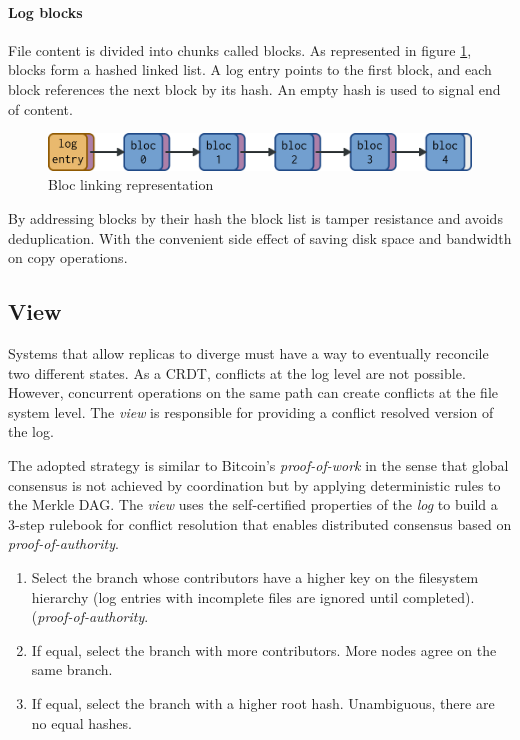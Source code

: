 \documentclass{sig-alternate}
\begin{document}
\paragraph{Log blocks}

File content is divided into chunks called blocks. As represented in figure \ref{fig:blocs}, blocks form a hashed linked list. A log entry points to the first block, and each block references the next block by its hash. An empty hash is used to signal end of content.

\begin{figure}
\centering
\includegraphics[width=\columnwidth]{imgs/blocs.png}
\caption{Bloc linking representation}
\label{fig:blocs}
\end{figure}

By addressing blocks by their hash the block list is tamper resistance and avoids deduplication. With the convenient side effect of saving disk space and bandwidth on copy operations.

\subsection{View} \label{view}

Systems that allow replicas to diverge must have a way to eventually reconcile two different states. As a CRDT, conflicts at the log level are not possible. However, concurrent operations on the same path can create conflicts at the file system level. The \textit{view} is responsible for providing a conflict resolved version of the log.

The adopted strategy is similar to Bitcoin's \textit{proof-of-work} in the sense that global consensus is not achieved by coordination but by applying deterministic rules to the Merkle DAG. The \textit{view} uses the self-certified properties of the \textit{log} to build a 3-step rulebook for conflict resolution that enables distributed consensus based on \textit{proof-of-authority}.

\begin{enumerate}
\item Select the branch whose contributors have a higher key on the filesystem hierarchy (log entries with incomplete files are ignored until completed). (\textit{proof-of-authority}.
\item If equal, select the branch with more contributors. More nodes agree on the same branch.
\item If equal, select the branch with a higher root hash. Unambiguous, there are no equal hashes.
\end{enumerate}
\end{document}
